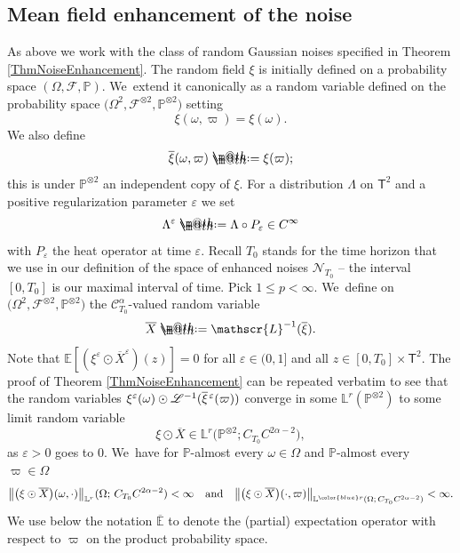 \documentclass[JEP,XML,SOM,Unicode,published]{cedram}
\makeatletter
\theoremstyle{definition}
\let\epsilon\varepsilon
\newcommand\bbE{\mathbb{E}}
\newcommand{\mcF}{\mathcal{F}}
\newcommand{\mcN}{\mathcal{N}}
\newcommand{\bbL}{\mathbb{L}}
\newcommand{\bbP}{\mathbb{P}}
\newcommand{\scrC}{\ensuremath{\mathscr{C}}}
\newcommand*{\defeq}{\mathrel{\rlap{%
\raisebox{0.3ex}{$\m@th\cdot$}}%
\raisebox{-0.3ex}{$\m@th\cdot$}}%
=}
\newcommand{\scrL}{\mathscr{L}}
\makeatother
\begin{document}
\subsection{Mean field enhancement of the noise}
\label{SubsectionEnhancedNoise}

As above we work with the class of random Gaussian noises specified in Theorem \ref{ThmNoiseEnhancement}. The random field $\xi$ is initially defined on a probability space $(\Omega,\mcF,\mathbb{P})$. We~extend it canonically as a random variable defined on the probability space $\bigl(\Omega^2, \mcF^{\otimes 2}, \mathbb{P}^{\otimes 2}\bigr)$ setting
\[
\xi(\omega,\varpi) = \xi(\omega).
\]
We also define
\[
\overline{\xi}(\omega, \varpi) \defeq \xi(\varpi);
\]
this is under $\mathbb{P}^{\otimes 2}$ an independent copy of $\xi$. For a distribution $\Lambda$ on $\mathsf{T}^2$ and a positive regularization parameter $\epsilon$ we set
\[
\Lambda^\epsilon \defeq \Lambda\circ P_\epsilon \in C^\infty
\]
with $P_\epsilon$ the heat operator at time $\epsilon$. Recall $T_0$ stands for the time horizon that we use in our definition of the space of enhanced noises ${{\boldsymbol{\mcN}}_{T_0}}$ -- the interval $[0,T_0]$ is our maximal interval of time. Pick $1\leq p<\infty$. We~define on $\bigl(\Omega^2, \mcF^{\otimes 2}, \mathbb{P}^{\otimes 2}\bigr)$ the $\scrC^\alpha_{T_0}$-valued random variable
\[
\overline{X} \defeq \scrL^{-1}(\overline\xi).
\]
Note that $\bbE[(\xi^\epsilon\odot \overline{X}^\epsilon)(z)]=0$ for all $\epsilon\in(0,1]$ and all $z\in [0,T_0]\times\mathsf{T}^2$. The proof of Theorem \ref{ThmNoiseEnhancement} can be repeated verbatim to see that the random variables $\xi^\epsilon(\omega) \odot\nobreak \scrL^{-1}(\overline{\xi}\hspace{1pt}^\epsilon(\varpi))$ converge in some $\bbL^ r(\bbP^{\otimes 2})$ to some limit random variable
\[
\xi\odot\overline{X} \in \bbL^ r\bigl(\mathbb{P}^{\otimes 2}; C_{T_0}C^{2\alpha-2}\bigr),
\]
as $\epsilon>0$ goes to $0$. We~have for $\mathbb{P}$-almost every $\omega\in\Omega$ and $\mathbb{P}$-almost every $\varpi\in\Omega$
\[
\big\Vert \bigl(\xi\odot\overline{X}\bigr)(\omega,\cdot) \big\Vert_{\bbL^ r}(\Omega; \,C_{T_0}C^{2\alpha-2}) < \infty
\quad
\text{and}
\quad
\big\Vert \bigl(\xi\odot\overline{X}\bigr)(\cdot,\varpi) \big\Vert_{\bbL^{ \color{blue} r}(\Omega; \,C_{T_0}C^{2\alpha-2})} < \infty.
\]
We use below the notation $\overline{\bbE}$ to denote the (partial) expectation operator with respect to $\varpi$ on the product probability space.
\end{document}
